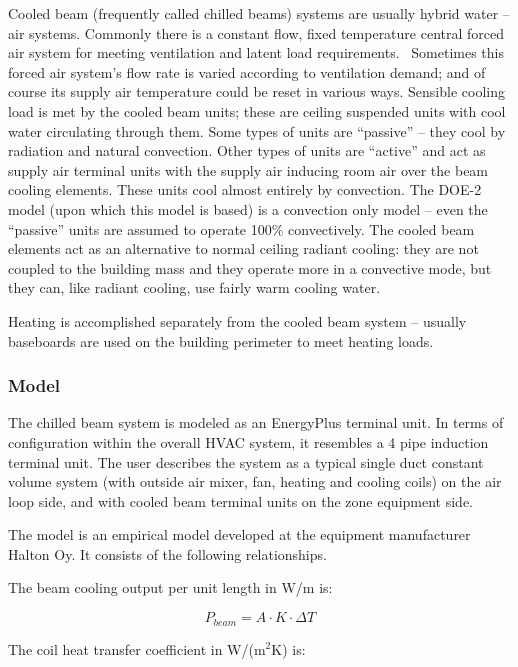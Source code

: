 Cooled beam (frequently called chilled beams) systems are usually hybrid water -- air systems. Commonly there is a constant flow, fixed temperature central forced air system for meeting ventilation and latent load requirements.~ Sometimes this forced air system's flow rate is varied according to ventilation demand; and of course its supply air temperature could be reset in various ways. Sensible cooling load is met by the cooled beam units; these are ceiling suspended units with cool water circulating through them. Some types of units are ``passive'' -- they cool by radiation and natural convection. Other types of units are ``active'' and act as supply air terminal units with the supply air inducing room air over the beam cooling elements. These units cool almost entirely by convection. The DOE-2 model (upon which this model is based) is a convection only model -- even the ``passive'' units are assumed to operate 100\% convectively. The cooled beam elements act as an alternative to normal ceiling radiant cooling: they are not coupled to the building mass and they operate more in a convective mode, but they can, like radiant cooling, use fairly warm cooling water.

Heating is accomplished separately from the cooled beam system -- usually baseboards are used on the building perimeter to meet heating loads.

\subsubsection{Model}\label{model-3}

The chilled beam system is modeled as an EnergyPlus terminal unit. In terms of configuration within the overall HVAC system, it resembles a 4 pipe induction terminal unit. The user describes the system as a typical single duct constant volume system (with outside air mixer, fan, heating and cooling coils) on the air loop side, and with cooled beam terminal units on the zone equipment side.

The model is an empirical model developed at the equipment manufacturer Halton Oy. It consists of the following relationships.

The beam cooling output per unit length in W/m is:

\begin{equation}
P_{beam} = A·K·\Delta T
\end{equation}

The coil heat transfer coefficient in W/(m\(^{2}\)K) is:

